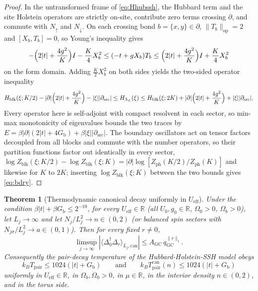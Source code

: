 \documentclass[11pt]{article}
\newtheorem{theorem}{Theorem}[section]
\theoremstyle{definition}
\theoremstyle{remark}
\newcommand{\R}{\mathbb{R}}
\newcommand{\eff}{\mathrm{eff}}
\newcommand{\pair}{\mathrm{pair}}
\newcommand{\Tpair}{T_{\pair}}
\newcommand{\Gb}{G_{\mathrm{b}}}
\newcommand{\Ueff}{U_{\eff}}
\begin{document}
\begin{proof}
In the untransformed frame of \eqref{eq:Hhubssh}, the Hubbard term and the site
Holstein operators are strictly on-site, contribute zero terms crossing $\partial$,
and commute with $N_\uparrow$ and $N_\downarrow$. On each crossing bond
$b=\{x,y\}\in\partial$, $\|T_b\|_{\mathrm{op}}=2$ and $[X_b,T_b]=0$, so Young's
inequality gives
\[
-\Bigl(2|t|+\frac{4g^2}{K}\Bigr)I-\frac{K}{4}X_b^2
\le(-t+gX_b)T_b\le
\Bigl(2|t|+\frac{4g^2}{K}\Bigr)I+\frac{K}{4}X_b^2
\]
on the form domain. Adding $\frac{K}{2}X_b^2$ on both sides yields the two-sided
operator inequality
\[
H_{\mathrm{blk}}(\xi;K/2)-|\partial|\Bigl(2|t|+\frac{4g^2}{K}\Bigr)-|\xi||\partial_{\mathrm{src}}|
\le H_{\Lambda_L}(\xi)\le
H_{\mathrm{blk}}(\xi;2K)+|\partial|\Bigl(2|t|+\frac{4g^2}{K}\Bigr)+|\xi||\partial_{\mathrm{src}}| .
\]
Every operator here is self-adjoint with compact resolvent in each
sector, so min-max monotonicity of eigenvalues bounds the two traces by
$E=\beta|\partial|(2|t|+4\Gb)+\beta|\xi||\partial_{\mathrm{src}}|$. The boundary
oscillators act on tensor factors decoupled from all blocks and commute with the
number operators, so their partition functions factor out identically in every sector,
$\log Z_{\mathrm{blk}}(\xi;K/2)-\log Z_{\mathrm{blk}}(\xi;K)
=|\partial|\log[Z_{\mathrm{ph}}(K/2)/Z_{\mathrm{ph}}(K)]$ and likewise for $K$ to $2K$;
inserting $\log Z_{\mathrm{blk}}(\xi;K)$ between the two bounds gives \eqref{eq:bdry}.
\end{proof}

\begin{theorem}[Thermodynamic canonical decay uniformly in $\Ueff$]
\label{thm:canon}
Under the condition $\beta|t|+\beta\Gb\le2^{-10}$, for every $\Ueff\in\R$ (all
$U_0,g_0\in\R$, $\Omega_0>0$, $\Omega_b>0$), let $L_j\to\infty$ and let
$N_j/L_j^2\to n\in(0,2)$ (or balanced spin sectors with $N_{j\sigma}/L_j^2\to a\in(0,1)$).
Then for every fixed $r\ne0$,
\begin{equation}
\limsup_{j\to\infty}\left|\langle\Delta_0^\dagger\Delta_r\rangle_{L_j,\mathrm{can}}
\right|\le A_{\mathrm{GC}}\,q_{\mathrm{GC}}^{\|r\|_1}.
\label{eq:canon}
\end{equation}
Consequently the pair-decay temperature of the Hubbard-Holstein-SSH model obeys
\begin{equation}
k_B\Tpair\le1024\left(|t|+\Gb\right)
\qquad\text{and}\qquad
k_B\Tpair^{\mathrm{can}}(n)\le1024\left(|t|+\Gb\right)
\label{eq:tpair}
\end{equation}
uniformly in $\Ueff\in\R$, in $\Omega_b,\Omega_0>0$, in $\mu\in\R$, in the interior
density $n\in(0,2)$, and in the torus side.
\end{theorem}
\end{document}
